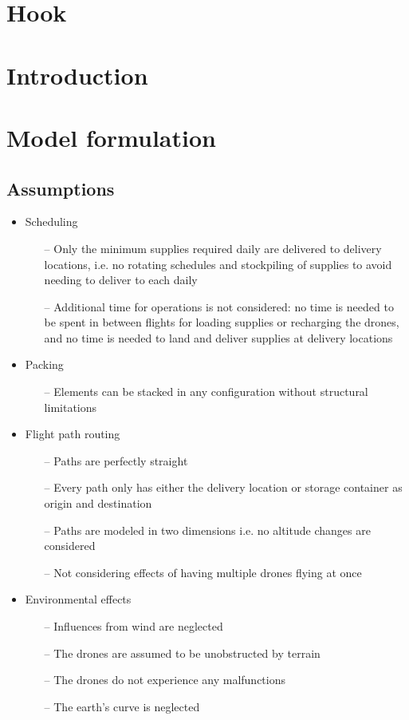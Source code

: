 \documentclass[12pt]{article}
\begin{document}
\begin{multicols}{2}
\section{Hook}
\lipsum[1]

\section{Introduction}
\lipsum[2]

\section{Model formulation}
\lipsum[3]

\subsection{Assumptions}

\begin{itemize}
	\item Scheduling
	\begin{itemize}
		\item[--] Only the minimum supplies required daily are delivered to delivery locations, i.e. no rotating schedules and stockpiling of supplies to avoid needing to deliver to each daily
		\item[--] Additional time for operations is not considered: no time is needed to be spent in between flights for loading supplies or recharging the drones, and no time is needed to land and deliver supplies at delivery locations
	\end{itemize}
	\item Packing
	\begin{itemize}
		\item[--] Elements can be stacked in any configuration without structural limitations
	\end{itemize}
	\item Flight path routing
	\begin{itemize}
		\item[--] Paths are perfectly straight
		\item[--] Every path only has either the delivery location or storage container as origin and destination
		\item[--] Paths are modeled in two dimensions i.e. no altitude changes are considered
		\item[--] Not considering effects of having multiple drones flying at once
	\end{itemize}
	\item Environmental effects
	\begin{itemize}
		\item[--] Influences from wind are neglected
		\item[--] The drones are assumed to be unobstructed by terrain
		\item[--] The drones do not experience any malfunctions
		\item[--] The earth’s curve is neglected
	\end{itemize}
\end{itemize}



\end{multicols}
\end{document}
